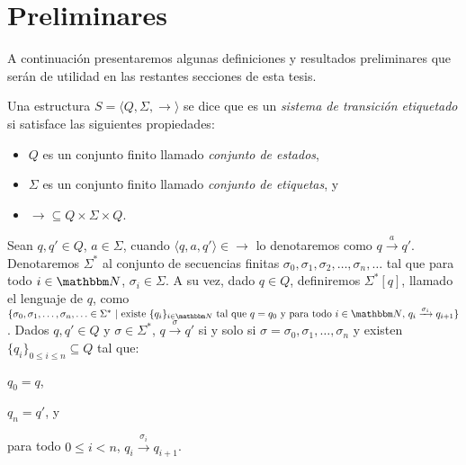 \chapter{Preliminares}
\label{preliminares}
A continuación presentaremos algunas definiciones y resultados preliminares que serán de utilidad en las restantes secciones de esta tesis.


\begin{definition} \label{def:LTS}
Una estructura $S = \langle Q, \Sigma, \longrightarrow \rangle$ se dice que es un \emph{sistema de transición etiquetado} si satisface las siguientes propiedades:
\begin{itemize}
\item $Q$ es un conjunto finito llamado \emph{conjunto de estados},
\item $\Sigma$ es un conjunto finito llamado \emph{conjunto de etiquetas}, y
\item $\longrightarrow \subseteq Q \times \Sigma \times Q$.
\end{itemize}
Sean $q, q' \in Q$, $a \in \Sigma$, cuando $\langle q, a, q' \rangle \in \longrightarrow$ lo denotaremos como $q \xrightarrow{a} q'$. Denotaremos $\Sigma^*$ al conjunto de secuencias finitas $\sigma_0, \sigma_1, \sigma_2, \ldots, \sigma_n, \ldots$ tal que para todo $i \in \nat$, $\sigma_i \in \Sigma$. A su vez, dado $q \in Q$, definiremos $\Sigma^* [q]$, llamado el lenguaje de $q$, como $\{ \sigma_0, \sigma_1, \ldots, \sigma_n, \ldots \in \Sigma^*\ |\ \text{existe } \{q_i\}_{i \in \nat} \text{ tal que } q = q_0 \text{ y para todo } i \in \nat \text{, } q_i \xrightarrow{\sigma_i} q_{i+1}\}$. Dados $q, q' \in Q$ y $\sigma \in \Sigma^*$, $q \xrightarrow{\sigma} q'$ si y solo si $\sigma = \sigma_0, \sigma_1, \ldots, \sigma_n$ y existen $\{q_i\}_{0 \leq i \leq n} \subseteq Q$ tal que:
\begin{inparaenum}[1-]
\item $q_0 = q$,
\item $q_n = q'$, y
\item para todo $0 \leq i < n$, $q_i \xrightarrow{\sigma_i} q_{i+1}$.
\end{inparaenum}
\end{definition}

